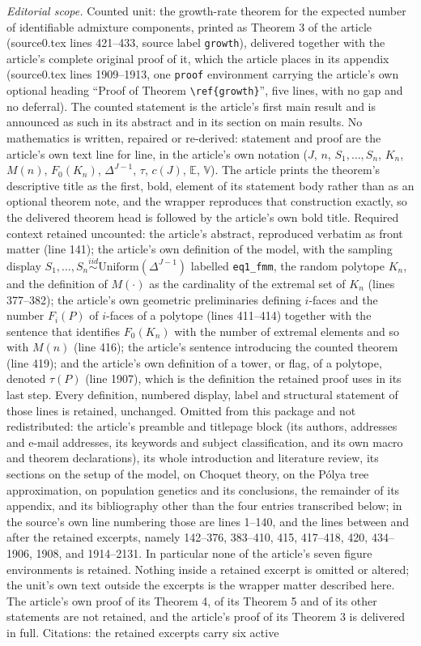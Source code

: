 \documentclass[10pt,a4paper]{amsart}
\theoremstyle{plain}
\begin{document}
\noindent\textit{Editorial scope.} Counted unit: the growth-rate theorem for the expected number of identifiable admixture components, printed as Theorem 3 of the article (source0.tex lines 421--433, source label \texttt{growth}), delivered together with the article's complete original proof of it, which the article places in its appendix (source0.tex lines 1909--1913, one \texttt{proof} environment carrying the article's own optional heading ``Proof of Theorem \texttt{\textbackslash ref\{growth\}}'', five lines, with no gap and no deferral). The counted statement is the article's first main result and is announced as such in its abstract and in its section on main results. No mathematics is written, repaired or re-derived: statement and proof are the article's own text line for line, in the article's own notation ($J$, $n$, $S_1,\dots,S_n$, $K_n$, $M(n)$, $F_0(K_n)$, $\Delta^{J-1}$, $\tau$, $c(J)$, $\mathbb{E}$, $\mathbb{V}$). The article prints the theorem's descriptive title as the first, bold, element of its statement body rather than as an optional theorem note, and the wrapper reproduces that construction exactly, so the delivered theorem head is followed by the article's own bold title. Required context retained uncounted: the article's abstract, reproduced verbatim as front matter (line 141); the article's own definition of the model, with the sampling display $S_1,\dots,S_n\stackrel{iid}{\sim}\mbox{Uniform}(\Delta^{J-1})$ labelled \texttt{eq1\_fmm}, the random polytope $K_n$, and the definition of $M(\cdot)$ as the cardinality of the extremal set of $K_n$ (lines 377--382); the article's own geometric preliminaries defining $i$-faces and the number $F_i(P)$ of $i$-faces of a polytope (lines 411--414) together with the sentence that identifies $F_0(K_n)$ with the number of extremal elements and so with $M(n)$ (line 416); the article's sentence introducing the counted theorem (line 419); and the article's own definition of a tower, or flag, of a polytope, denoted $\tau(P)$ (line 1907), which is the definition the retained proof uses in its last step. Every definition, numbered display, label and structural statement of those lines is retained, unchanged. Omitted from this package and not redistributed: the article's preamble and titlepage block (its authors, addresses and e-mail addresses, its keywords and subject classification, and its own macro and theorem declarations), its whole introduction and literature review, its sections on the setup of the model, on Choquet theory, on the P\'olya tree approximation, on population genetics and its conclusions, the remainder of its appendix, and its bibliography other than the four entries transcribed below; in the source's own line numbering those are lines 1--140, and the lines between and after the retained excerpts, namely 142--376, 383--410, 415, 417--418, 420, 434--1906, 1908, and 1914--2131. In particular none of the article's seven figure environments is retained. Nothing inside a retained excerpt is omitted or altered; the unit's own text outside the excerpts is the wrapper matter described here. The article's own proof of its Theorem 4, of its Theorem 5 and of its other statements are not retained, and the article's proof of its Theorem 3 is delivered in full. Citations: the retained excerpts carry six active 
\end{document}
